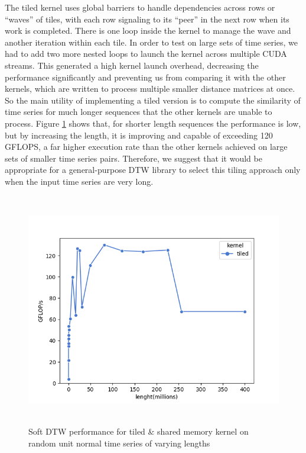 \documentclass[12pt, letterpaper]{article}
\begin{document}
The tiled kernel uses global barriers to handle dependencies across rows or
``waves'' of tiles, with each row signaling to its ``peer'' in the next row when
its work is completed. There is one loop inside the kernel to manage the wave
and another iteration within each tile. In order to test on large sets of time
series, we had to add two more nested loops to launch the kernel across multiple
CUDA streams. This generated a high kernel launch overhead, decreasing the
performance significantly and preventing us from comparing it with the other
kernels, which are written to process multiple smaller distance matrices at
once. So the main utility of implementing a tiled version is to compute the
similarity of time series for much longer sequences that the other kernels are
unable to process. Figure \ref{plot_tiled} shows that, for shorter length
sequences the performance is low, but by increasing the length, it is improving
and capable of exceeding 120 GFLOPS, a far higher execution rate than the other
kernels achieved on large sets of smaller time series pairs. Therefore, we
suggest that it would be appropriate for a general-purpose DTW library to select
this tiling approach only when the input time series are very long.

\begin{figure}[htbp]
\includegraphics[height=4in]{fig/plot_tiled.png}
\centering
\caption{Soft DTW performance for tiled \& shared memory kernel on random unit
  normal time series of varying lengths}
\label{plot_tiled}
\end{figure}
\end{document}
